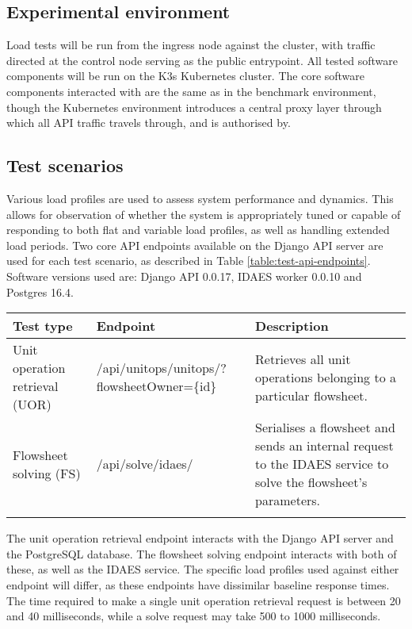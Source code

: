 \subsection{Experimental environment}

Load tests will be run from the ingress node against the cluster, with traffic directed at the control node serving as the public entrypoint. All tested software components will be run on the K3s Kubernetes cluster. The core software components interacted with are the same as in the benchmark environment, though the Kubernetes environment introduces a central proxy layer through which all API traffic travels through, and is authorised by.


\subsection{Test scenarios}

Various load profiles are used to assess system performance and dynamics. This allows for observation of whether the system is appropriately tuned or capable of responding to both flat and variable load profiles, as well as handling extended load periods. Two core API endpoints available on the Django API server are used for each test scenario, as described in Table \ref{table:test-api-endpoints}. Software versions used are: Django API 0.0.17, IDAES worker 0.0.10 and Postgres 16.4.

\begin{tabularx}{\textwidth}{|p{}|X|p{}|}
    \hline
    \textbf{Test type} & \textbf{Endpoint} & \textbf{Description} \\ \hline
    Unit operation retrieval (UOR) & /api/unitops/unitops/?flowsheetOwner=\{id\} & Retrieves all unit operations belonging to a particular flowsheet. \\ \hline

    Flowsheet solving (FS) & /api/solve/idaes/ & Serialises a flowsheet and sends an internal request to the IDAES service to solve the flowsheet's parameters. \\ \hline

    \caption{API endpoints used for system testing}
    \label{table:test-api-endpoints}
\end{tabularx}

The unit operation retrieval endpoint interacts with the Django API server and the PostgreSQL database. The flowsheet solving endpoint interacts with both of these, as well as the IDAES service. The specific load profiles used against either endpoint will differ, as these endpoints have dissimilar baseline response times. The time required to make a single unit operation retrieval request is between 20 and 40 milliseconds, while a solve request may take 500 to 1000 milliseconds.

